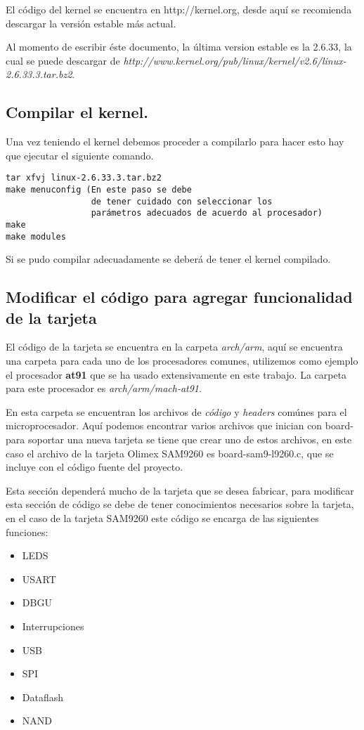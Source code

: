 El código del kernel se encuentra en http://kernel.org, desde aquí se recomienda descargar la versión estable más actual.

Al momento de escribir éste documento, la última version estable es la 2.6.33, la cual se puede descargar de \emph{http://www.kernel.org/pub/linux/kernel/v2.6/linux-2.6.33.3.tar.bz2}.

\subsection{Compilar el kernel.}

Una vez teniendo el kernel debemos proceder a compilarlo para hacer esto hay que ejecutar el siguiente comando.

\begin{verbatim}
tar xfvj linux-2.6.33.3.tar.bz2
make menuconfig (En este paso se debe
                 de tener cuidado con seleccionar los 
                 parámetros adecuados de acuerdo al procesador)
make 
make modules
\end{verbatim}

Si se pudo compilar adecuadamente se deberá de tener el kernel compilado.

\subsection{Modificar el c\'odigo para agregar funcionalidad de la tarjeta}

El código de la tarjeta se encuentra en la carpeta \emph{arch/arm}, aquí se encuentra una carpeta para cada uno de los procesadores comunes, utilizemos como ejemplo el procesador \textbf{at91} que se ha usado extensivamente en este trabajo. La carpeta para este procesador es \emph{arch/arm/mach-at91}.

En esta carpeta se encuentran los archivos de \emph{código} y \emph{headers} comúnes para el microprocesador. Aquí podemos encontrar varios archivos que inician con board- para soportar una nueva tarjeta se tiene que crear uno de estos archivos, en este caso el archivo de la tarjeta Olimex SAM9260 es board-sam9-l9260.c, que se incluye con el código fuente del proyecto.

Esta sección dependerá mucho de la tarjeta que se desea fabricar, para modificar esta sección de código se debe de tener conocimientos necesarios sobre la tarjeta, en el caso de la tarjeta SAM9260 este código se encarga de las siguientes funciones:

\begin{itemize}
\item LEDS
\item USART
\item DBGU
\item Interrupciones
\item USB
\item SPI
\item Dataflash
\item NAND
\end{itemize}


